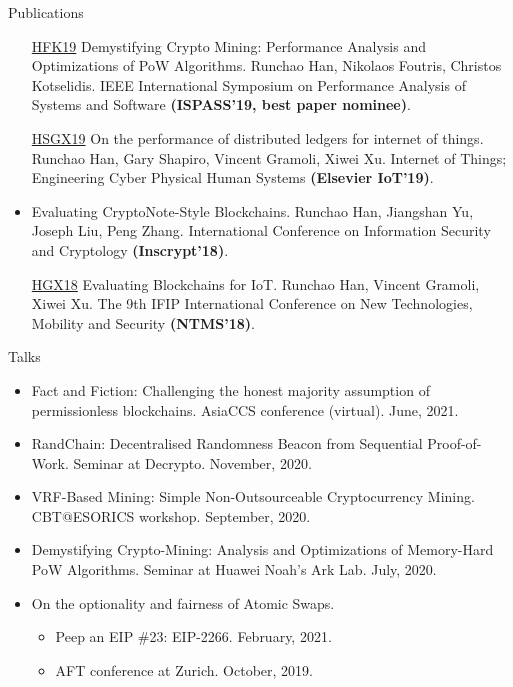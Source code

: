 \documentclass{resume} %
\begin{document}
\begin{rSection}{Publications}
\begin{itemize}
        \item[\href{https://www.research.manchester.ac.uk/portal/files/85753741/paper.pdf}{HFK19}] Demystifying Crypto Mining: Performance Analysis and Optimizations of PoW Algorithms. Runchao Han, Nikolaos Foutris, Christos Kotselidis. IEEE International Symposium on Performance Analysis of Systems and Software \textbf{(ISPASS'19, best paper nominee)}.
        \item[\href{https://gramoli.redbellyblockchain.io/web/doc/pubs/IoT2019.pdf}{HSGX19}] On the performance of distributed ledgers for internet of things. Runchao Han, Gary Shapiro, Vincent Gramoli, Xiwei Xu. Internet of Things; Engineering Cyber Physical Human Systems \textbf{(Elsevier IoT'19)}.
        \item[\href{https://www.researchgate.net/profile/Runchao_Han/publication/331227984_Evaluating_CryptoNote-Style_Blockchains_14th_International_Conference_Inscrypt_2018_Fuzhou_China_December_14-17_2018_Revised_Selected_Papers/links/5c747901299bf1268d25a5f5/Evaluating-CryptoNote-Style-Blockchains-14th-International-Conference-Inscrypt-2018-Fuzhou-China-December-14-17-2018-Revised-Selected-Papers.pdf}{HYLZ18}] Evaluating CryptoNote-Style Blockchains. Runchao Han, Jiangshan Yu, Joseph Liu, Peng Zhang. International Conference on Information Security and Cryptology \textbf{(Inscrypt'18)}.
        \item[\href{https://gramoli.redbellyblockchain.io/web/doc/pubs2/blockchain-iot.pdf}{HGX18}] Evaluating Blockchains for IoT. Runchao Han, Vincent Gramoli, Xiwei Xu. The 9th IFIP International Conference on New Technologies, Mobility and Security \textbf{(NTMS'18)}.
    \end{itemize}
\end{rSection}

\begin{rSection}{Talks}
    \begin{itemize}
        \item Fact and Fiction: Challenging the honest majority assumption of permissionless blockchains. AsiaCCS conference (virtual). June, 2021.
        \item RandChain: Decentralised Randomness Beacon from Sequential Proof-of-Work. Seminar at Decrypto. November, 2020.
        \item VRF-Based Mining: Simple Non-Outsourceable Cryptocurrency Mining. CBT@ESORICS workshop. September, 2020.
        \item Demystifying Crypto-Mining: Analysis and Optimizations of Memory-Hard PoW Algorithms. Seminar at Huawei Noah's Ark Lab. July, 2020.
        \item On the optionality and fairness of Atomic Swaps.
              \begin{itemize}
                  \item Peep an EIP \#23: EIP-2266. February, 2021.
                  \item AFT conference at Zurich. October, 2019.
              \end{itemize}
    \end{itemize}
\end{rSection}
\end{document}
